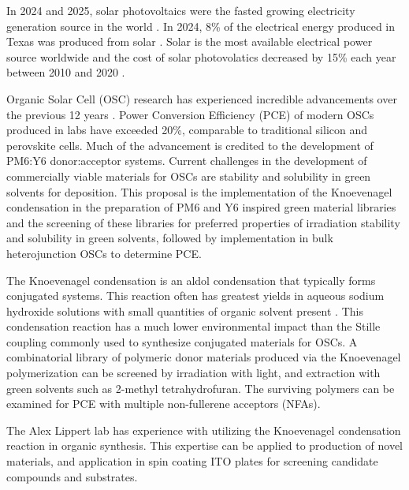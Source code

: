 
In 2024 and 2025, solar photovoltaics were the fasted growing electricity generation source in the world \autocite{AnnualChangeGlobal}.
In 2024, 8\% of the electrical energy produced in Texas was produced from solar \autocite{UnitedStatesUS}.
Solar is the most available electrical power source worldwide and the cost of solar photovolatics decreased by 15\% each year between 2010 and 2020 \autocite{nijsseMomentumSolarEnergy2023}.

Organic Solar Cell (OSC) research has experienced incredible advancements over the previous 12 years \autocite{xuChallengingPM6likeDonor2023}.
Power Conversion Efficiency (PCE) of modern OSCs produced in labs have exceeded 20\%, comparable to traditional silicon and perovskite cells\autocite{chenOrganicSolarCells2019}.
Much of the advancement is credited to the development of PM6:Y6 donor:acceptor systems\autocite{huEfficientOrganicSolar2026}.
Current challenges in the development of commercially viable materials for OSCs are stability\autocite{tegegneProgressStableOrganic2025} and solubility in green solvents for deposition.
This proposal is the implementation of the Knoevenagel condensation\autocite{ohSynthesisConjugatedPolymer2021} in the preparation of PM6 and Y6 inspired green material libraries and the screening of these libraries for preferred properties of irradiation stability and solubility in green solvents, followed by implementation in bulk heterojunction OSCs to determine PCE.

The Knoevenagel condensation is an aldol condensation that typically forms conjugated systems.
This reaction often has greatest yields in aqueous sodium hydroxide solutions with small quantities of organic solvent present \autocite{ohSynthesisConjugatedPolymer2021}.
This condensation reaction has a much lower environmental impact than the Stille coupling commonly used to synthesize conjugated materials for OSCs.
A combinatorial library of polymeric donor materials produced via the Knoevenagel polymerization can be screened by irradiation with light, and extraction with green solvents such as 2-methyl tetrahydrofuran.
The surviving polymers can be examined for PCE with multiple non-fullerene acceptors (NFAs).

The Alex Lippert lab has experience with utilizing the Knoevenagel condensation reaction in organic synthesis.
This expertise can be applied to production of novel materials, and application in spin coating ITO plates for screening candidate compounds and substrates.


